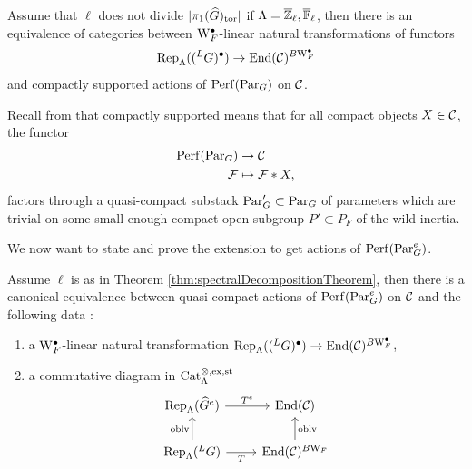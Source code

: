 \begin{thm}\label{thm:spectralDecompositionTheorem}
Assume that $\ell$ does not divide $|\pi_1(\widehat{G})_{\textnormal{tor}}|$ if $\Lambda = \overline{\mathbb{Z}}_{\ell}, \overline{\mathbb{F}}_{\ell}$, then there is an equivalence of categories between $\mathrm{W}_F^{\bullet}$-linear natural transformations of functors
$$\mathrm{Rep}_{\Lambda}(({^L}G)^{\bullet}) \to \mathrm{End}(\mathcal{C})^{B\mathrm{W}_F^{\bullet}}$$
and compactly supported actions of $\mathrm{Perf}(\mathrm{Par}_G)$ on $\mathcal{C}$. 
\end{thm}

\begin{rque}
    Recall from \cite{Geometrization} that compactly supported means that for all compact objects $X \in \mathcal{C}$, the functor 
    \begin{align*}
        \mathrm{Perf}(\mathrm{Par}_G) &\to \mathcal{C} \\
        \mathcal{F} &\mapsto \mathcal{F} * X,
    \end{align*}
    factors through a quasi-compact substack $\mathrm{Par}_G' \subset \mathrm{Par}_G$ of parameters which are trivial on some small enough compact open subgroup $P' \subset P_F$ of the wild inertia. 
\end{rque}

We now want to state and prove the extension to get actions of $\mathrm{Perf}(\mathrm{Par}_G^e)$. 

\begin{thm}\label{thm:extendedSpectralDecompositionTheorem}
Assume $\ell$ is as in Theorem \ref{thm:spectralDecompositionTheorem}, then there is a canonical equivalence between quasi-compact actions of $\mathrm{Perf}(\mathrm{Par}_G^e)$ on $\mathcal{C}$ and the following data :  
\begin{enumerate}
\item a $\mathrm{W}_F^{\bullet}$-linear natural transformation $\mathrm{Rep}_{\Lambda}(({^L}G)^{\bullet}) \to \mathrm{End}(\mathcal{C})^{B\mathrm{W}_F^{\bullet}}$, 
\item a commutative diagram in $\mathrm{Cat}^{\otimes,\mathrm{ex}, \mathrm{st}}_{\Lambda}$  
\begin{equation}\label{diag:required-commutative-diagram}
    \begin{tikzcd}
	{\Rep_{\Lambda}(\widehat{G}^e}) & {\End(\Ccal) } \\
	{\Rep_{\Lambda}({^L}G}) & {\End(\Ccal)^{B\Weil_F}}
	\arrow["{T^e}", from=1-1, to=1-2]
	\arrow["\oblv", from=2-1, to=1-1]
	\arrow["T"', from=2-1, to=2-2]
	\arrow["\oblv"', from=2-2, to=1-2]
\end{tikzcd}
\end{equation}
\end{enumerate}
\end{thm}



